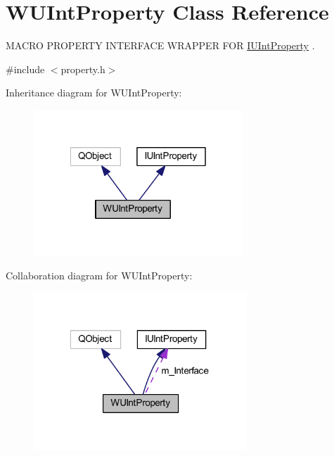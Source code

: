 \hypertarget{class_w_u_int_property}{\section{W\-U\-Int\-Property Class Reference}
\label{class_w_u_int_property}
}


M\-A\-C\-R\-O P\-R\-O\-P\-E\-R\-T\-Y I\-N\-T\-E\-R\-F\-A\-C\-E W\-R\-A\-P\-P\-E\-R F\-O\-R \hyperlink{class_i_u_int_property}{I\-U\-Int\-Property} .  




{\ttfamily \#include $<$property.\-h$>$}



Inheritance diagram for W\-U\-Int\-Property\-:
\nopagebreak
\begin{figure}[H]
\begin{center}
\leavevmode
\includegraphics[width=223pt]{class_w_u_int_property__inherit__graph}
\end{center}
\end{figure}


Collaboration diagram for W\-U\-Int\-Property\-:
\nopagebreak
\begin{figure}[H]
\begin{center}
\leavevmode
\includegraphics[width=227pt]{class_w_u_int_property__coll__graph}
\end{center}
\end{figure}
